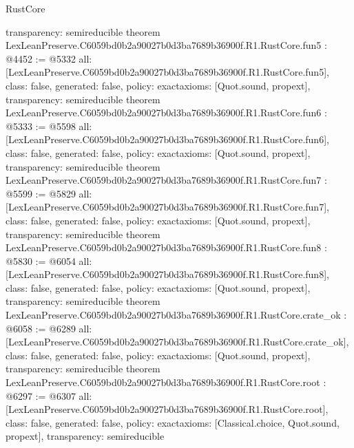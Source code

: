 \begin{lexlean}{RustCore}
\begin{coremodule}
{  transparency: semireducible
}
theorem LexLeanPreserve.C6059bd0b2a90027b0d3ba7689b36900f.R1.RustCore.fun5 : @4452 := @5332 {
  all: [LexLeanPreserve.C6059bd0b2a90027b0d3ba7689b36900f.R1.RustCore.fun5],
  class: false,
  generated: false,
  policy: exact{axioms: [Quot.sound, propext]},
  transparency: semireducible
}
theorem LexLeanPreserve.C6059bd0b2a90027b0d3ba7689b36900f.R1.RustCore.fun6 : @5333 := @5598 {
  all: [LexLeanPreserve.C6059bd0b2a90027b0d3ba7689b36900f.R1.RustCore.fun6],
  class: false,
  generated: false,
  policy: exact{axioms: [Quot.sound, propext]},
  transparency: semireducible
}
theorem LexLeanPreserve.C6059bd0b2a90027b0d3ba7689b36900f.R1.RustCore.fun7 : @5599 := @5829 {
  all: [LexLeanPreserve.C6059bd0b2a90027b0d3ba7689b36900f.R1.RustCore.fun7],
  class: false,
  generated: false,
  policy: exact{axioms: [Quot.sound, propext]},
  transparency: semireducible
}
theorem LexLeanPreserve.C6059bd0b2a90027b0d3ba7689b36900f.R1.RustCore.fun8 : @5830 := @6054 {
  all: [LexLeanPreserve.C6059bd0b2a90027b0d3ba7689b36900f.R1.RustCore.fun8],
  class: false,
  generated: false,
  policy: exact{axioms: [Quot.sound, propext]},
  transparency: semireducible
}
theorem LexLeanPreserve.C6059bd0b2a90027b0d3ba7689b36900f.R1.RustCore.crate_ok : @6058 := @6289 {
  all: [LexLeanPreserve.C6059bd0b2a90027b0d3ba7689b36900f.R1.RustCore.crate_ok],
  class: false,
  generated: false,
  policy: exact{axioms: [Quot.sound, propext]},
  transparency: semireducible
}
theorem LexLeanPreserve.C6059bd0b2a90027b0d3ba7689b36900f.R1.RustCore.root : @6297 := @6307 {
  all: [LexLeanPreserve.C6059bd0b2a90027b0d3ba7689b36900f.R1.RustCore.root],
  class: false,
  generated: false,
  policy: exact{axioms: [Classical.choice, Quot.sound, propext]},
  transparency: semireducible
}


\end{coremodule}
\end{lexlean}

